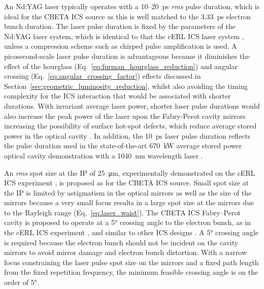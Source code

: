 \documentclass[../main.tex]{subfiles}
\begin{document}
An Nd:YAG laser typically operates with a 10--20~\si{\pico\second} \textit{rms} pulse duration, which is ideal for the CBETA ICS source as this is well matched to the 3.33~\si{\pico\second} electron bunch duration. The laser pulse duration is fixed by the parameters of the Nd:YAG laser system, which is identical to that the cERL ICS laser system \cite{akagi2016narrow}, unless a compression scheme such as chirped pulse amplification \cite{strickland1985compression} is used. A picosecond-scale laser pulse duration is advantageous because it diminishes the effect of the hourglass (Eq.~\ref{eq:furman_hourglass_reduction}) and angular crossing (Eq.~\ref{eq:angular_crossing_factor}) effects \cite{miyahara2008luminosity} discussed in Section~\ref{sec:geometric_luminosity_reduction}, whilst also avoiding the timing complexity for the ICS interaction that would be associated with shorter durations. With invariant average laser power, shorter laser pulse durations would also increase the peak power of the laser upon the Fabry-Perot cavity mirrors increasing the possibility of surface hot-spot defects, which reduce average stored power in the optical cavity \cite{wang2020prior}. In addition, the 10~\si{\pico\second} laser pulse duration reflects the pulse duration used in the state-of-the-art 670~\si{\kilo\watt} average stored power optical cavity demonstration with a 1040~\si{\nano\meter} wavelength laser \cite{carstens2014megawatt}.     

An \textit{rms} spot size at the IP of 25~\si{\micro\meter}, experimentally demonstrated on the cERL ICS experiment \cite{akagi2016narrow}, is proposed as for the CBETA ICS source. Small spot size at the IP is limited by astigmatism in the optical mirrors as well as the size of the mirrors because a very small focus results in a large spot size at the mirrors due to the Rayleigh range (Eq.~\ref{eq:laser_waist}). The CBETA ICS Fabry--Perot cavity is proposed to operate at a 5\si{\degree} crossing angle to the electron bunch, as in the cERL ICS experiment \cite{akagi2016narrow}, and similar to other ICS designs \cite{faillace2019status,variola2014thomx}. A 5\si{\degree} crossing angle is required because the electron bunch should not be incident on the cavity mirrors to avoid mirror damage and electron bunch distortion. With a narrow focus constraining the laser pulse spot size on the mirrors and a fixed path length from the fixed repetition frequency, the minimum feasible crossing angle is on the order of 5\si{\degree}.   
\end{document}
